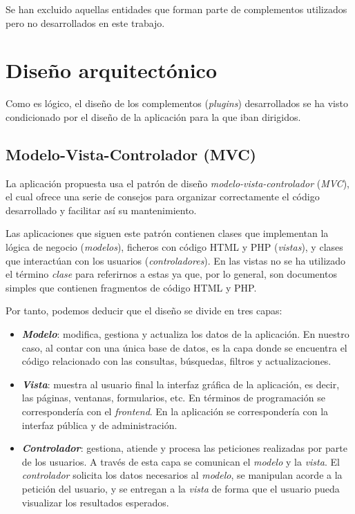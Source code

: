 
Se han excluido aquellas entidades que forman parte de complementos utilizados pero 
no desarrollados en este trabajo.

\section{Diseño arquitectónico}

Como es lógico, el diseño de los complementos (\emph{plugins})
desarrollados se ha visto condicionado por el diseño de la aplicación
para la que iban dirigidos.


\subsection{Modelo-Vista-Controlador (MVC)}

La aplicación propuesta usa el patrón de diseño
\emph{modelo-vista-controlador} (\emph{MVC}), el cual ofrece una serie
de consejos para organizar correctamente el código desarrollado y
facilitar así su mantenimiento.

Las aplicaciones que siguen este patrón contienen clases que implementan
la lógica de negocio (\emph{modelos}), ficheros con código HTML y PHP
(\emph{vistas}), y clases que interactúan con los usuarios
(\emph{controladores}). En las vistas no se ha utilizado el término
\emph{clase} para referirnos a estas ya que, por lo general, son
documentos simples que contienen fragmentos de código HTML y PHP.

Por tanto, podemos deducir que el diseño se divide en tres capas:

\begin{itemize}
\tightlist
\item
  \textbf{\emph{Modelo}}: modifica, gestiona y actualiza los datos de la
  aplicación. En nuestro caso, al contar con una única base de datos, es
  la capa donde se encuentra el código relacionado con las consultas,
  búsquedas, filtros y actualizaciones.
\item
  \textbf{\emph{Vista}}: muestra al usuario final la interfaz gráfica de la
  aplicación, es decir, las páginas, ventanas, formularios, etc. En
  términos de programación se correspondería con el \emph{frontend}. En
  la aplicación se correspondería con la interfaz pública y de
  administración.
\item
  \textbf{\emph{Controlador}}: gestiona, atiende y procesa las peticiones
  realizadas por parte de los usuarios. A través de esta capa se
  comunican el \emph{modelo} y la \emph{vista}. El \emph{controlador}
  solicita los datos necesarios al \emph{modelo}, se manipulan acorde a
  la petición del usuario, y se entregan a la \emph{vista} de forma que
  el usuario pueda visualizar los resultados esperados.
\end{itemize}

